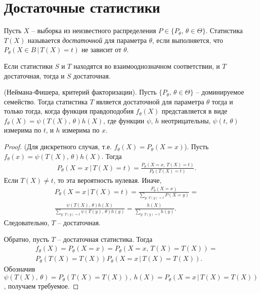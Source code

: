\section{Достаточные статистики}
\begin{definition}
    Пусть $X$ -- выборка из неизвестного распределения $P \in \{P_\theta,\, \theta \in \Theta\}$. Статистика $T(X)$ называется \textit{достаточной} для параметра $\theta$, если выполняется, что $P_\theta(X \in B\, \vert\, T(X) = t)$ не зависит от $\theta$.
\end{definition}
\begin{note}
    Если статистики $S$ и $T$ находятся во взаимооднозначном соответствии, и $T$ достаточная, тогда и $S$ достаточная.
\end{note}
\begin{theorem} 
    (Неймана-Фишера, критерий факторизации). Пусть $\{P_\theta,\, \theta \in \Theta\}$ -- доминируемое семейство. Тогда статистика $T$ является достаточной для параметра $\theta$ тогда и только тогда, когда функция правдоподобия $f_\theta(X)$ представляется в виде $f_\theta(X) = \psi(T(X),\, \theta)h(X)$, где функции $\psi,\, h$ неотрицательны, $\psi(t,\, \theta)$ измерима по $t$, и $h$ измерима по $x$.
\end{theorem}
\begin{proof}
    (Для дискретного случая, т.е. $f_\theta(X) = P_\theta(X = x)$). Пусть $f_\theta(x) = \psi(T(X),\, \theta)h(X)$. Тогда 
    \begin{gather*}
        P_\theta(X = x\, \vert\, T(X) = t) = \frac{P_\theta(X = x,\, T(X) = t)}{P_\theta(T(X) = t)}.
    \end{gather*}
    Если $T(X) \ne t$, то эта вероятность нулевая. Иначе,
    \begin{gather*}
        P_\theta(X = x\, \vert\, T(X) = t) = \frac{P_\theta (X = x)}{\sum_{y:\, T(y) = t}P(X = y)} =\\ \frac{\psi(T(X),\, \theta)h(X)}{\sum_{y:\, T(y) = t}\psi(T(y),\, \theta)h(y)} = \frac{h(X)}{\sum_{y:\, T(y) = t}h(y)}.
    \end{gather*}
    Следовательно, $T$ -- достаточная.
    
    Обратно, пусть $T$ -- достаточная статистика. Тогда
    \begin{gather*}
        f_\theta(X)=P_\theta(X = x) = P_\theta(X = x,\, T(X) = T(X)) =\\ P_\theta(T(X) = T(X))P_\theta(X = x\, \vert\, T(X) = T(X)).
    \end{gather*}
    Обозначив $\psi(T(X),\, \theta) = P_\theta(T(X) = T(X)),\ h(X) = P_\theta(X = x\, \vert\, T(X) = T(X))$, получаем требуемое.
\end{proof}

